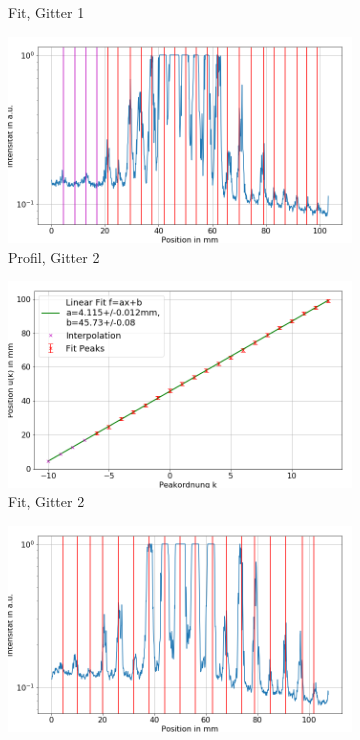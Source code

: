 \documentclass[
	a4paper,
	12pt,
	pagesize,
	ngerman
]{scrartcl}
\begin{document}
\begin{figure}[H]
\begin{subfigure}[b]{0.475\textwidth}
            \caption[]%
            {Fit, Gitter 1}
            \label{fig_2_fit_g1}
        \end{subfigure}
        \begin{subfigure}[b]{0.475\textwidth}
            \centering
            \includegraphics[width=\textwidth]{img/2/2_gitter_g2}
            \caption%
            {Profil, Gitter 2}
            \label{fig_2_profil_g2}
        \end{subfigure}
        \hfill
        \begin{subfigure}[b]{0.475\textwidth}
            \centering
            \includegraphics[width=\textwidth]{img/2/2_gitter_g2_fit}
            \caption[]%
            {Fit, Gitter 2}
            \label{fig_2_fit_g2}
        \end{subfigure}
        \begin{subfigure}[b]{0.475\textwidth}
            \centering
            \includegraphics[width=\textwidth]{img/2/2_gitter_g3}

\end{subfigure}
\end{figure}
\end{document}
